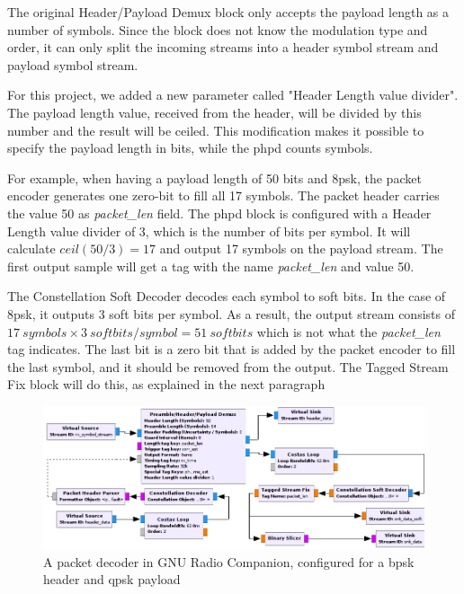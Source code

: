 The original Header/Payload Demux block only accepts the payload length as a number of symbols. Since the block does not know the modulation type and order, it can only split the incoming streams into a header symbol stream and payload symbol stream. \medskip

For this project, we added a new parameter called "Header Length value divider". The payload length value, received from the header, will be divided by this number and the result will be ceiled. This modification makes it possible to specify the payload length in bits, while the \gls{phpd} counts symbols.\medskip

For example, when having a payload length of 50 bits and \gls{8psk}, the packet encoder generates one zero-bit to fill all 17 symbols. The packet header carries the value 50 as \textit{packet\_len} field. The \gls{phpd} block is configured with a Header Length value divider of 3, which is the number of bits per symbol. It will calculate $ceil(50/3) = 17$ and output 17 symbols on the payload stream. The first output sample will get a tag with the name \textit{packet\_len} and value 50.\medskip

The Constellation Soft Decoder decodes each symbol to soft bits. In the case of \gls{8psk}, it outputs 3 soft bits per symbol. As a result, the output stream consists of $17\ symbols \times 3\ softbits/symbol = 51\ softbits$ which is not what the \textit{packet\_len} tag indicates. The last bit is a zero bit that is added by the packet encoder to fill the last symbol, and it should be removed from the output. The Tagged Stream Fix block will do this, as explained in the next paragraph \medskip

\begin{figure}[H]
    \centering
    \includegraphics[width=1.05\textwidth]{img_packets/packet_decoder_grc.png}
    \caption{A packet decoder in GNU Radio Companion, configured for a \gls{bpsk} header and \gls{qpsk} payload}
    \label{fig:packet_decoder_grc}
\end{figure}

